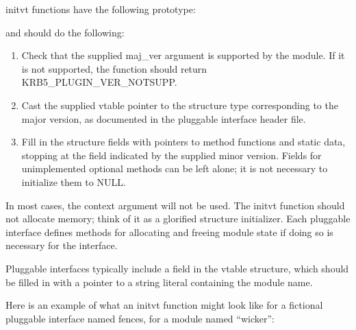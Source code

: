\documentclass[letterpaper,10pt,english]{sphinxmanual}
\begin{document}
\sphinxAtStartPar
initvt functions have the following prototype:

\begin{sphinxVerbatim}[commandchars=\\\{\}]
  
                                            
                                          
\end{sphinxVerbatim}

\sphinxAtStartPar
and should do the following:
\begin{enumerate}
%
\item {} 
\sphinxAtStartPar
Check that the supplied maj\_ver argument is supported by the
module.  If it is not supported, the function should return
KRB5\_PLUGIN\_VER\_NOTSUPP.

\item {} 
\sphinxAtStartPar
Cast the supplied vtable pointer to the structure type
corresponding to the major version, as documented in the pluggable
interface header file.

\item {} 
\sphinxAtStartPar
Fill in the structure fields with pointers to method functions and
static data, stopping at the field indicated by the supplied minor
version.  Fields for unimplemented optional methods can be left
alone; it is not necessary to initialize them to NULL.

\end{enumerate}

\sphinxAtStartPar
In most cases, the context argument will not be used.  The initvt
function should not allocate memory; think of it as a glorified
structure initializer.  Each pluggable interface defines methods for
allocating and freeing module state if doing so is necessary for the
interface.

\sphinxAtStartPar
Pluggable interfaces typically include a  field in the vtable
structure, which should be filled in with a pointer to a string
literal containing the module name.

\sphinxAtStartPar
Here is an example of what an initvt function might look like for a
fictional pluggable interface named fences, for a module named
“wicker”:
\end{document}
